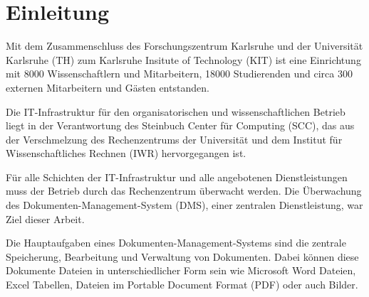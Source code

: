 \section{Einleitung}







Mit dem Zusammenschluss des Forschungszentrum Karlsruhe und der Universität Karlsruhe (TH) zum Karlsruhe Insitute of Technology (KIT) ist eine Einrichtung mit 8000 Wissenschaftlern und Mitarbeitern, 18000 Studierenden und circa 300 externen Mitarbeitern und Gästen entstanden.


Die IT-Infrastruktur für den organisatorischen und wissenschaftlichen Betrieb liegt in der Verantwortung des Steinbuch Center für Computing (SCC), das aus der Verschmelzung des Rechenzentrums der Universität und dem Institut für Wissenschaftliches Rechnen (IWR) hervorgegangen ist.

Für alle Schichten der IT-Infrastruktur und alle angebotenen Dienstleistungen muss der Betrieb durch das Rechenzentrum überwacht werden.
Die Überwachung des Dokumenten-Management-System (\gls{DMS}), einer zentralen Dienstleistung, war Ziel dieser Arbeit.



Die Hauptaufgaben eines Dokumenten-Management-Systems sind die zentrale Speicherung, Bearbeitung und Verwaltung von Dokumenten.
Dabei können diese Dokumente Dateien in unterschiedlicher Form sein wie Microsoft Word Dateien, Excel Tabellen, Dateien im Portable Document Format (\gls{PDF}) oder auch Bilder.

